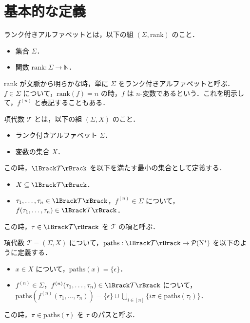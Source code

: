 \section{基本的な定義}

\begin{definition}
  ランク付きアルファベットとは，以下の組 $(\Sigma, \mathrm{rank})$ のこと．
  \begin{itemize}
    \item 集合 $\Sigma$．
    \item 関数 $\mathrm{rank}: \Sigma \to \mathbb{N}$．
  \end{itemize}
  $\mathrm{rank}$ が文脈から明らかな時，単に $\Sigma$ をランク付きアルファベットと呼ぶ．$f \in \Sigma$ について，$\mathrm{rank}(f) = n$ の時，$f$ は $n$-変数であるという．これを明示して，$f^{(n)}$ と表記することもある．
\end{definition}

\begin{definition}
  項代数 $\mathcal{T}$ とは，以下の組 $(\Sigma, X)$ のこと．
  \begin{itemize}
    \item ランク付きアルファベット $\Sigma$．
    \item 変数の集合 $X$．
  \end{itemize}
  この時，$\semanticf{\mathcal{T}}$ を以下を満たす最小の集合として定義する．
  \begin{itemize}
    \item $X \subseteq \semanticf{\mathcal{T}}$．
    \item $\tau_1, \ldots, \tau_n \in \semanticf{\mathcal{T}}$，$f^{(n)} \in \Sigma$ について，$f(\tau_1, \ldots, \tau_n) \in \semanticf{\mathcal{T}}$．
  \end{itemize}
  この時，$\tau \in \semanticf{\mathcal{T}}$ を $\mathcal{T}$ の項と呼ぶ．
\end{definition}

\begin{definition}[パス (path)]
  項代数 $\mathcal{T} = (\Sigma, X)$ について，$\mathrm{paths}: \semanticf{\mathcal{T}} \to \Power(\mathrm{N}^*)$ を以下のように定義する．
  \begin{itemize}
    \item $x \in X$ について，$\mathrm{paths}(x) = \{\epsilon\}$．
    \item $f^{(n)} \in \Sigma$，$f^{(n)}(\tau_1, \ldots, \tau_n) \in \semanticf{\mathcal{T}}$ について，$\mathrm{paths}(f^{(n)}(\tau_1, \ldots, \tau_n)) = \{\epsilon\} \cup \bigcup_{i \in [n]} \{i\pi \in \mathrm{paths}(\tau_i)\}$．
  \end{itemize}
  この時，$\pi \in \mathrm{paths}(\tau)$ を $\tau$ のパスと呼ぶ．
\end{definition}

